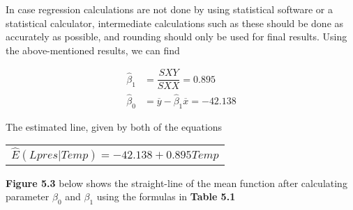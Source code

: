 \documentclass{article}
\begin{document}
    In case regression calculations are not done by using statistical software or a statistical calculator, intermediate calculations such as these should be done as accurately as possible, and rounding should only be used for final results. Using the above-mentioned results, we can find
    
    \begin{align} 
        \hat\beta_{1} &= \dfrac{SXY}{SXX} = 0.895 \\
        \hat\beta_{0} & = \overline{y} - \hat\beta_{1} \overline{x} = -42.138
    \end{align} 
    
    The estimated line, given by both of the equations

    \begin{center}
        \begin{tabular}{c}
            ${\hat{E} (Lpres|Temp) = -42.138 + 0.895Temp}$ \\
        \end{tabular} 
    \end{center}
    
    \textbf{Figure 5.3} below shows the straight-line of the mean function after calculating parameter $\beta_{0}$ and $\beta_{1}$ using the formulas in \textbf{Table 5.1}
    
    \begin{center}
    \end{center}
    
\end{document}
